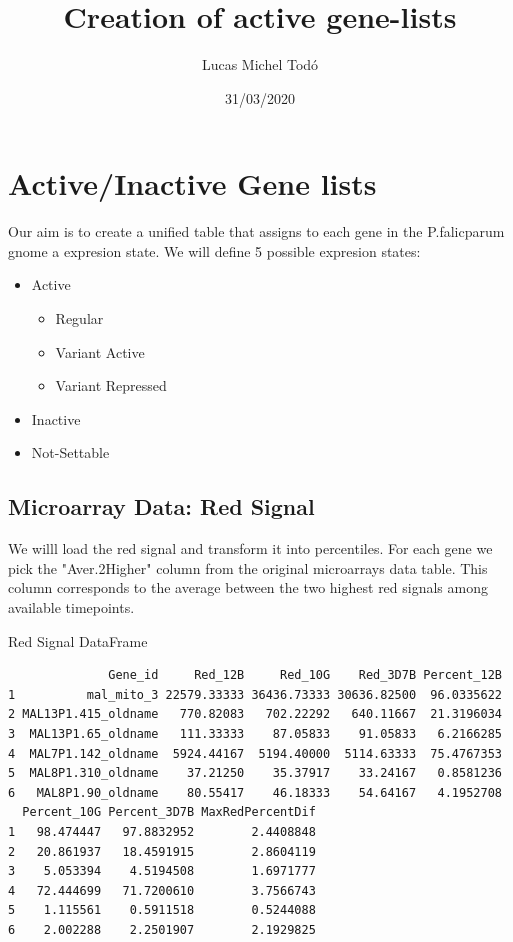 \documentclass[11pt]{article}
\author{Lucas Michel Todó}
\date{31/03/2020}
\title{Creation of active gene-lists}
\begin{document}
\maketitle
\tableofcontents \clearpage
\section{Active/Inactive Gene lists}
\label{sec:orgaf23e2d}
Our aim is to create a unified table that assigns to each gene in the P.falicparum gnome a expresion state.
We will define 5 possible expresion states:
\begin{itemize}
\item Active
\begin{itemize}
\item Regular
\item Variant Active
\item Variant Repressed
\end{itemize}
\item Inactive
\item Not-Settable
\end{itemize}

\subsection{Microarray Data: Red Signal}
\label{sec:org7e2c45e}
We willl load the red signal and transform it into percentiles. For each gene we pick the "Aver.2Higher" column from the original microarrays data table. This column corresponds to the average between the two highest red signals among available timepoints.

Red Signal DataFrame
\begin{verbatim}
              Gene_id     Red_12B     Red_10G    Red_3D7B Percent_12B
1          mal_mito_3 22579.33333 36436.73333 30636.82500  96.0335622
2 MAL13P1.415_oldname   770.82083   702.22292   640.11667  21.3196034
3  MAL13P1.65_oldname   111.33333    87.05833    91.05833   6.2166285
4  MAL7P1.142_oldname  5924.44167  5194.40000  5114.63333  75.4767353
5  MAL8P1.310_oldname    37.21250    35.37917    33.24167   0.8581236
6   MAL8P1.90_oldname    80.55417    46.18333    54.64167   4.1952708
  Percent_10G Percent_3D7B MaxRedPercentDif
1   98.474447   97.8832952        2.4408848
2   20.861937   18.4591915        2.8604119
3    5.053394    4.5194508        1.6971777
4   72.444699   71.7200610        3.7566743
5    1.115561    0.5911518        0.5244088
6    2.002288    2.2501907        2.1929825
\end{verbatim}
\end{document}
